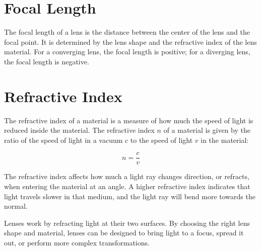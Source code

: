 \section{Focal Length}

The focal length of a lens is the distance between the center of the
lens and the focal point. It is determined by the lens shape and the
refractive index of the lens material. For a converging lens, the
focal length is positive; for a diverging lens, the focal length
is negative.

\section{Refractive Index}

The refractive index of a material is a measure of how much the speed
of light is reduced inside the material. The refractive index $n$ of a
material is given by the ratio of the speed of light in a vacuum $c$
to the speed of light $v$ in the material:

\[
n = \frac{c}{v}
\]

The refractive index affects how much a light ray changes direction,
or refracts, when entering the material at an angle. A higher
refractive index indicates that light travels slower in that medium,
and the light ray will bend more towards the normal.

Lenses work by refracting light at their two surfaces. By choosing the
right lens shape and material, lenses can be designed to bring light
to a focus, spread it out, or perform more complex transformations.
